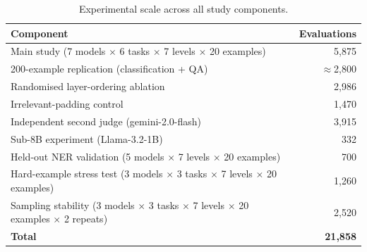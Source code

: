 \begin{table}[t]
\centering
\caption{Experimental scale across all study components.}
\label{tab:scale}
\small
\begin{tabular}{lr}
\toprule
Component & Evaluations \\
\midrule
Main study (7 models $\times$ 6 tasks $\times$ 7 levels $\times$ 20 examples) & 5,875 \\
200-example replication (classification + QA) & $\approx$2,800 \\
Randomised layer-ordering ablation & 2,986 \\
Irrelevant-padding control & 1,470 \\
Independent second judge (gemini-2.0-flash) & 3,915 \\
Sub-8B experiment (Llama-3.2-1B) & 332 \\
Held-out NER validation (5 models $\times$ 7 levels $\times$ 20 examples) & 700 \\
Hard-example stress test (3 models $\times$ 3 tasks $\times$ 7 levels $\times$ 20 examples) & 1,260 \\
Sampling stability (3 models $\times$ 3 tasks $\times$ 7 levels $\times$ 20 examples $\times$ 2 repeats) & 2,520 \\
\midrule
\textbf{Total} & \textbf{21,858} \\
\bottomrule
\end{tabular}
\end{table}
